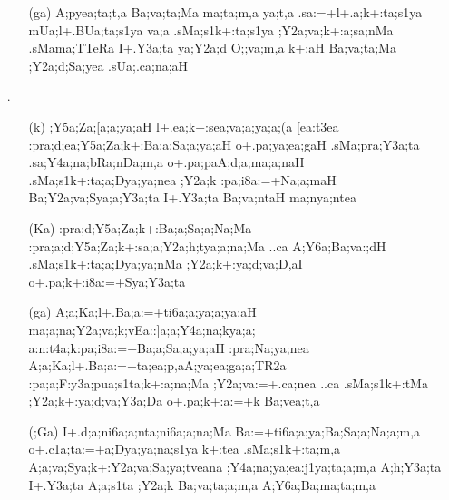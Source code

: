 \begin{spacing}{1.15}
\begin{itemize} 
\item[] \begin{itemize}
          \item[({\sktf ga})] {\sktf A;pyea;ta;t,a Ba;va;ta;Ma ma;ta;m,a\ZF{,}
ya;t,a .sa:=+l+.a;k+:ta;s1ya mUa;l+.BUa;ta;s1ya
va;a .sMa;s1k+:ta;s1ya ;Y2a;va;k+:a;sa;nMa .sMama;TTeRa I+.Y3a;ta  ya;Y2a;d O;;va;m,a\ZF{,} k+:aH Ba;va;ta;Ma
;Y2a;d;Sa;yea .sUa;.ca;na;aH }
          \end{itemize}                                         
          
\item[{\sktf 8}.]  \begin{itemize}
   \item[({\sktf k})] {\sktf ;Y5a;Za;[a;a;ya;aH
l+.ea;k+:sea;va;a;ya;a;(a [ea:t3ea\ZF{,}
:pra;d;ea;Y5a;Za;k+:Ba;a;Sa;a;ya;aH o+.pa;ya;ea;gaH
.sMa;pra;Y3a;ta .sa;Y4a;na;bRa;nDa;m,a o+.pa;paA;d;a;ma;a;naH\ZF{,} .sMa;s1k+:ta;a;Dya;ya;nea ;Y2a;k :pa;i8a:=+Na;a;maH
Ba;Y2a;va;Sya;a;Y3a;ta I+.Y3a;ta Ba;va;ntaH ma;nya;ntea }  
              
   \item[({\sktf Ka})] {\sktf :pra;d;Y5a;Za;k+:Ba;a;Sa;a;Na;Ma
:pra;a;d;Y5a;Za;k+:sa;a;Y2a;h;tya;a;na;Ma ..ca
A;Y6a;Ba;va:;dH
.sMa;s1k+:ta;a\ZF{-};Dya;ya;nMa ;Y2a;k+:ya;d;va;D,aI o+.pa;k+:i8a:=+Sya;Y3a;ta  }
              
   \item[({\sktf ga})] {\sktf A;a;Ka;l+.Ba;a:=+ti6a;a;ya;a;ya;aH%
 ma;a;na;Y2a;va;k\ZF{-};vEa::]a;a;Y4a;na;k\ZF{-}ya;a;%
a:n:t4a;k\ZF{-}:pa;i8a:=+Ba;a;Sa;a;ya;aH
:pra;Na;ya;nea\ZF{,} A;a;Ka;l+.Ba;a:=+ta;ea;p,aA;ya;ea;ga;a;TR2a :pa;a;F:y3a;pua;s1ta;k+:a;na;Ma ;Y2a;va:=+.ca;nea ..ca\ZF{,}
.sMa;s1k+:tMa ;Y2a;k+:ya;d;va;Y3a;Da
o+.pa;k+:a:=+k Ba;vea;t,a  } 
              
   \item[({\sktf ;Ga})] {\sktf I+.d;a;ni6a;a;nta;ni6a;a;na;Ma
Ba:=+ti6a;a;ya;Ba;Sa;a;Na;a;m,a o+.c1a;ta:=+a;Dya;ya;na;s1ya
k+:tea .sMa;s1k+:ta;m,a
A;a;va;Sya;k+:Y2a;va;Sa;ya;tveana ;Y4a;na;ya;ea:j1ya;ta;a;m,a A;h;Y3a;ta\ZF{,} I+.Y3a;ta
A;a;s1ta ;Y2a;k Ba;va;ta;a;m,a A;Y6a;Ba;ma;ta;m,a
}
                            

\end{itemize}
\end{itemize}
\end{spacing}
